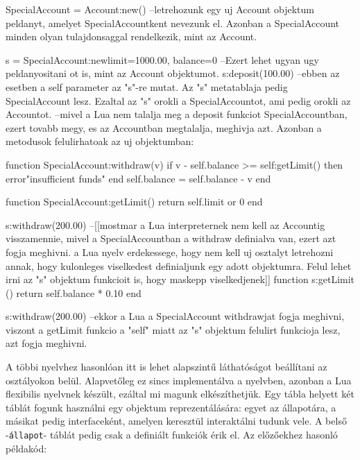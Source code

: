 \begin{lua}
SpecialAccount = Account:new() --letrehozunk egy uj Account objektum peldanyt, amelyet SpecialAccountkent nevezunk el. Azonban a SpecialAccount minden olyan tulajdonsaggal rendelkezik, mint az Account.

s = SpecialAccount:new{limit=1000.00, balance=0} --Ezert lehet ugyan ugy peldanyositani ot is, mint az Account objektumot.
s:deposit(100.00) --ebben az esetben a self parameter az "s"-re mutat. Az "s" metatablaja pedig SpecialAccount lesz. Ezaltal az "s" orokli a SpecialAccountot, ami pedig orokli az Accountot.
--mivel a Lua nem talalja meg a deposit funkciot SpecialAccountban, ezert tovabb megy, es az Accountban megtalalja, meghivja azt. Azonban a metodusok felulirhatoak az uj objektumban:

function SpecialAccount:withdraw(v)
	if v - self.balance >= self:getLimit() then
		error"insufficient funds"
	end
	self.balance = self.balance - v
end

function SpecialAccount:getLimit()
	return self.limit or 0
end

s:withdraw(200.00) --[[mostmar a Lua interpreternek nem kell az Accountig visszamennie, mivel a SpecialAccountban a withdraw definialva van, ezert azt fogja meghivni. 
a Lua nyelv erdekessege, hogy nem kell uj osztalyt letrehozni annak, hogy kulonleges viselkedest definialjunk egy adott objektumra. Felul lehet irni az "s" objektum funkcioit is, hogy maskepp viselkedjenek]]
function s:getLimit ()
  return self.balance * 0.10
end

s:withdraw(200.00) --ekkor a Lua a SpecialAccount withdrawjat fogja meghivni, viszont a getLimit funkcio a "self" miatt az "s" objektum felulirt funkcioja lesz, azt fogja meghivni.
\end{lua}
\pagebreak
{}
A többi nyelvhez hasonlóan itt is lehet alapszintű láthatóságot beállítani az osztályokon belül. Alapvetőleg ez sincs implementálva a nyelvben, azonban a Lua flexibilis nyelvnek készült, ezáltal mi magunk elkészíthetjük. Egy tábla helyett két táblát fogunk használni egy objektum reprezentálására:
egyet az állapotára, a másikat pedig interfaceként, amelyen keresztül interaktálni tudunk vele. A belső -\texttt{állapot}- táblát pedig csak a definiált funkciók érik el. Az előzőekhez hasonló példakód:

